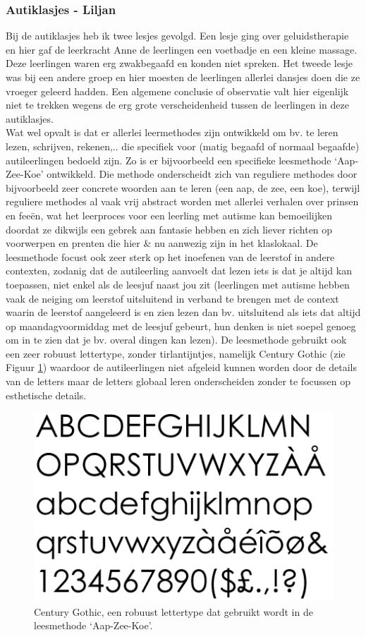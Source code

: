 \documentclass[a4paper,11pt]{article}
\theoremstyle{definition}
\begin{document}
\subsubsection{Autiklasjes - Liljan}\label{auti}
Bij de autiklasjes heb ik twee lesjes gevolgd. Een lesje ging over 
geluidstherapie en hier gaf de leerkracht Anne de leerlingen een voetbadje en 
een kleine massage. Deze leerlingen waren erg zwakbegaafd en konden niet 
spreken. Het tweede lesje was bij een andere groep en hier moesten de leerlingen 
allerlei dansjes doen die ze vroeger geleerd hadden. Een algemene conclusie of 
observatie valt hier eigenlijk niet te trekken wegens de erg grote 
verscheidenheid tussen de leerlingen in deze autiklasjes. \\

\noindent Wat wel opvalt is dat 
er allerlei leermethodes zijn ontwikkeld om bv. te leren lezen, schrijven, rekenen,.. die specifiek voor (matig begaafd of normaal begaafde) autileerlingen bedoeld zijn. 
Zo is er bijvoorbeeld een specifieke leesmethode 
`Aap-Zee-Koe' ontwikkeld. Die methode onderscheidt zich van reguliere methodes 
door bijvoorbeeld zeer concrete woorden aan te leren (een aap, de zee, een koe), 
terwijl reguliere methodes al vaak vrij abstract worden met allerlei verhalen 
over prinsen en feeën, wat het leerproces voor een leerling met autisme kan bemoeilijken doordat ze dikwijls een gebrek aan fantasie hebben en zich liever richten op voorwerpen en prenten die hier \& nu aanwezig zijn in het klaslokaal. 
De leesmethode focust ook zeer sterk op het inoefenen van de leerstof in andere 
contexten, zodanig dat de autileerling aanvoelt dat lezen iets 
is dat je altijd kan toepassen, niet enkel als de leesjuf naast jou zit (leerlingen met autisme hebben vaak de neiging om leerstof uitsluitend in verband te brengen met de context waarin de leerstof aangeleerd is en zien lezen dan bv. uitsluitend als iets dat altijd op maandagvoormiddag met de leesjuf gebeurt, hun denken is niet soepel genoeg om in te zien dat je bv. overal dingen kan lezen). 
De leesmethode gebruikt ook een zeer robuust lettertype, zonder tirlantijntjes, namelijk Century 
Gothic (zie Figuur \ref{gothic}) waardoor de autileerlingen niet afgeleid kunnen worden door de details van de letters maar de letters globaal leren onderscheiden zonder te focussen op esthetische details.
\begin{figure}[h!]
  \centering
  \includegraphics[scale=0.4]{century.png}\caption{Century Gothic, een robuust lettertype dat gebruikt wordt in de leesmethode `Aap-Zee-Koe'.}\label{gothic}
\end{figure}
\end{document}
